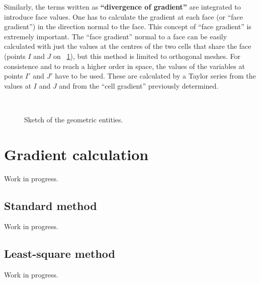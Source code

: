 Similarly, the terms written as \textbf{``divergence of gradient''} are
integrated to introduce face values. One has to calculate the gradient at
each face (or ``face gradient'') in the direction normal to the face. This
concept of ``face gradient'' is extremely important. The ``face gradient''
normal to a face can be easily calculated with just the values at the
centres of the two cells that share the face (points $I$ and $J$ on 
\figurename~\ref{fig:sketch_internal_external_faces}),%
but this method is limited to orthogonal meshes.
For consistence and to reach a higher order in space, the values of the
variables at points $I'$ and $J'$ have to be used. These are calculated by a
Taylor series from the values at $I$ and $J$ and from the ``cell gradient''
previously determined.

\begin{figure}[t]
\centering
\mbox{
 \,
}%
\caption{Sketch of the geometric entities.}
\label{fig:sketch_internal_external_faces}
\end{figure}

\section{Gradient calculation}
Work in progress.
\subsection{Standard method}\label{sec:space_discretization_it_grad}
Work in progress.
\subsection{Least-square method}
Work in progress.
